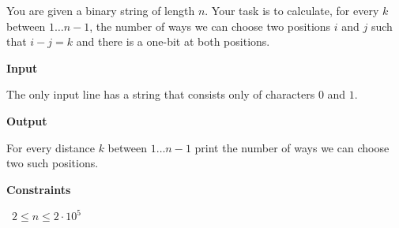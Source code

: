 You are given a binary string of length $n$. Your task is to calculate, for every $k$ between $1 \ldots n-1$, the number of ways we can choose two positions $i$ and $j$ such that $i-j=k$ and there is a one-bit at both positions.

\vspace{0.3cm}\noindent\textbf{Input}

The only input line has a string that consists only of characters $0$ and $1$.

\vspace{0.3cm}\noindent\textbf{Output}

For every distance $k$ between $1\ldots n-1$ print the number of ways we can choose two such positions.

\vspace{0.3cm}\noindent\textbf{Constraints}

\textbullet\ $2 \le n \le 2 \cdot 10^5$